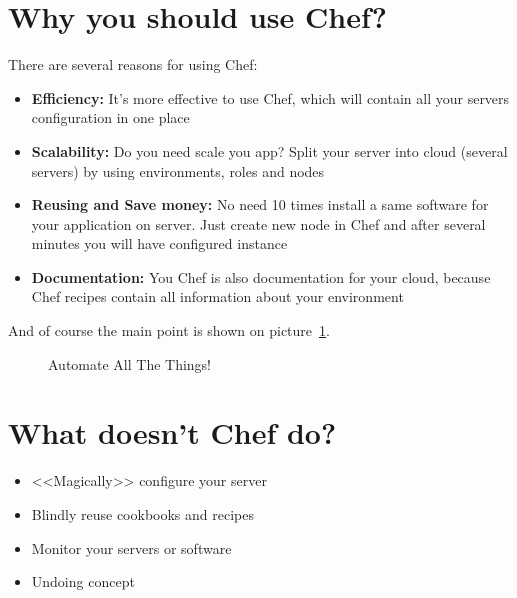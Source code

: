 \section{Why you should use Chef?}
\label{sec:what-benefits}

There are several reasons for using Chef:

\begin{itemize}
  \item \textbf{Efficiency:} It's more effective to use Chef, which will contain all your servers configuration in one place
  \item \textbf{Scalability:} Do you need scale you app? Split your server into cloud (several servers) by using environments, roles and nodes
  \item \textbf{Reusing and Save money:} No need 10 times install a same software for your application on server. Just create new node in Chef and after several minutes you will have configured instance
  \item \textbf{Documentation:} You Chef is also documentation for your cloud, because Chef recipes contain all information about your environment
\end{itemize}

And of course the main point is shown on picture~\ref{fig:automate-all-the-things}.

\begin{figure}[ht!]
  \caption{Automate All The Things!}
  \label{fig:automate-all-the-things}
\end{figure}


\section{What doesn't Chef do?}

\begin{itemize}
  \item <<Magically>> configure your server
  \item Blindly reuse cookbooks and recipes
  \item Monitor your servers or software
  \item Undoing concept
\end{itemize}
